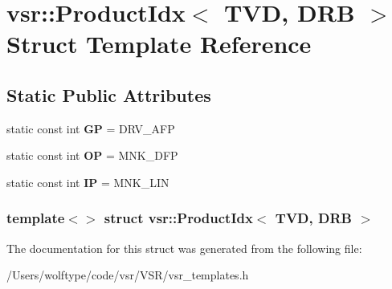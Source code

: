 \hypertarget{structvsr_1_1_product_idx_3_01_t_v_d_00_01_d_r_b_01_4}{\section{vsr\-:\-:Product\-Idx$<$ T\-V\-D, D\-R\-B $>$ Struct Template Reference}
\label{structvsr_1_1_product_idx_3_01_t_v_d_00_01_d_r_b_01_4}
}
\subsection*{Static Public Attributes}
\begin{DoxyCompactItemize}
\item 
\hypertarget{structvsr_1_1_product_idx_3_01_t_v_d_00_01_d_r_b_01_4_a91c8a3d28e63d9180fd5f6ba0d2f7dda}{static const int {\bfseries G\-P} = D\-R\-V\-\_\-\-A\-F\-P}\label{structvsr_1_1_product_idx_3_01_t_v_d_00_01_d_r_b_01_4_a91c8a3d28e63d9180fd5f6ba0d2f7dda}

\item 
\hypertarget{structvsr_1_1_product_idx_3_01_t_v_d_00_01_d_r_b_01_4_a2ba07e3ee2a77b1d71f88d3e2ffa8b1b}{static const int {\bfseries O\-P} = M\-N\-K\-\_\-\-D\-F\-P}\label{structvsr_1_1_product_idx_3_01_t_v_d_00_01_d_r_b_01_4_a2ba07e3ee2a77b1d71f88d3e2ffa8b1b}

\item 
\hypertarget{structvsr_1_1_product_idx_3_01_t_v_d_00_01_d_r_b_01_4_a50a6dd8fa7ce263173d68d9556b2e966}{static const int {\bfseries I\-P} = M\-N\-K\-\_\-\-L\-I\-N}\label{structvsr_1_1_product_idx_3_01_t_v_d_00_01_d_r_b_01_4_a50a6dd8fa7ce263173d68d9556b2e966}

\end{DoxyCompactItemize}
\subsubsection*{template$<$$>$ struct vsr\-::\-Product\-Idx$<$ T\-V\-D, D\-R\-B $>$}



The documentation for this struct was generated from the following file\-:\begin{DoxyCompactItemize}
\item 
/\-Users/wolftype/code/vsr/\-V\-S\-R/vsr\-\_\-templates.\-h\end{DoxyCompactItemize}
